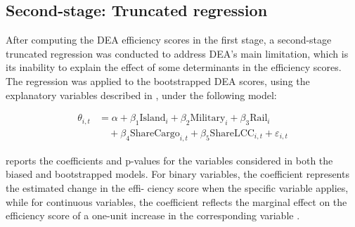 \vspace{-0.1cm}
\subsection{Second-stage: Truncated regression }
\label{subsec:resul_trunc}

After computing the DEA efficiency scores in the first stage, a second-stage truncated regression
was conducted to address DEA’s main limitation, which is its inability to explain the effect of some
determinants in the efficiency scores. The regression was applied to the bootstrapped DEA scores, using the explanatory variables described in , under the following model:

\vspace{-0.1cm}
\begin{equation}
    \label{eq:complete_regression}
\begin{aligned}
\theta_{i,t} &= \alpha + \beta_1 \text{Island}_{i} + \beta_2 \text{Military}_{i} + \beta_3 \text{Rail}_{i} \\
&\quad + \beta_4 \text{ShareCargo}_{i,t} + \beta_5 \text{ShareLCC}_{i,t} + \varepsilon_{i,t}
\end{aligned}
\end{equation}

\clearpage
{} reports the coefficients and p-values for the variables considered in both the biased and
bootstrapped models. For binary variables, the coefficient represents the estimated change in the effi-
ciency score when the specific variable applies, while for continuous variables, the coefficient reflects
the marginal effect on the efficiency score of a one-unit increase in the corresponding variable \cite{simar2007}.


